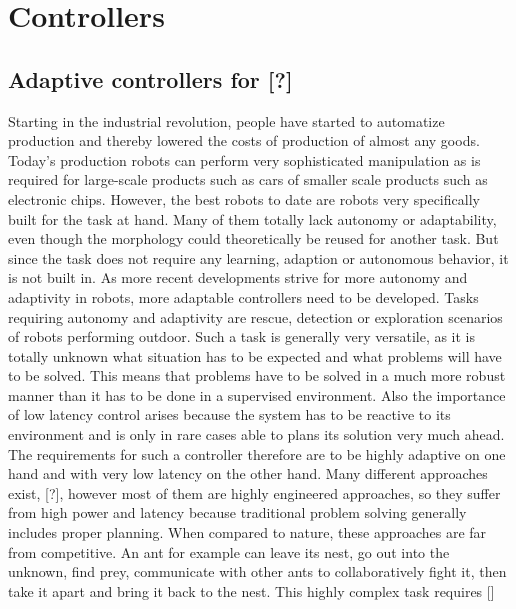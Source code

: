 \documentclass[main]{subfiles}
\begin{document}
\setcounter{chapter}{2}

\chapter{Controllers} %

\label{Chapter\thechapter} %


\section{Adaptive controllers for [?]}

Starting in the industrial revolution, people have started to automatize production and thereby lowered the costs of production of almost any goods. Today's production robots can perform very sophisticated manipulation as is required for large-scale products such as cars of smaller scale products such as electronic chips. However, the best robots to date are robots very specifically built for the task at hand. Many of them totally lack autonomy or adaptability, even though the morphology could theoretically be reused for another task. But since the task does not require any learning, adaption or autonomous behavior, it is not built in. As more recent developments strive for more autonomy and adaptivity in robots, more adaptable controllers need to be developed. Tasks requiring autonomy and adaptivity are rescue, detection or exploration scenarios of robots performing outdoor. Such a task is generally very versatile, as it is totally unknown what situation has to be expected and what problems will have to be solved. This means that problems have to be solved in a much more robust manner than it has to be done in a supervised environment. Also the importance of low latency control arises because the system has to be reactive to its environment and is only in rare cases able to plans its solution very much ahead. The requirements for such a controller therefore are to be highly adaptive on one hand and with very low latency on the other hand. Many different approaches exist, [?], however most of them are highly engineered approaches, so they suffer from high power and latency because traditional problem solving generally includes proper planning.  When compared to nature, these approaches are far from competitive. An ant for example can leave its nest, go out into the unknown, find prey, communicate with other ants to collaboratively fight it, then take it apart and bring it back to the nest. This highly complex task requires []
\end{document}
